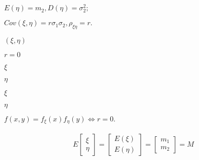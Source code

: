 \begin{preview}
\setcounter{equation}{0}%
\(E(\eta) = m_2, D(\eta) = \sigma_2^2;\)
\end{preview}

\begin{preview}
\setcounter{equation}{0}%
\(Cov(\xi, \eta) = r \sigma_1 \sigma_2, \rho_{\xi\eta} = r.\)
\end{preview}

\begin{preview}
\setcounter{equation}{0}%
\((\xi, \eta)\)
\end{preview}

\begin{preview}
\setcounter{equation}{0}%
\(r = 0\)
\end{preview}

\begin{preview}
\setcounter{equation}{0}%
\(\xi\)
\end{preview}

\begin{preview}
\setcounter{equation}{0}%
\(\eta\)
\end{preview}

\begin{preview}
\setcounter{equation}{0}%
\(\xi\)
\end{preview}

\begin{preview}
\setcounter{equation}{0}%
\(\eta\)
\end{preview}

\begin{preview}
\setcounter{equation}{0}%
\(f(x, y) = f_\xi(x) f_\eta(y) \Leftrightarrow r = 0.\)
\end{preview}

\begin{preview}
\setcounter{equation}{0}%
\begin{align}
E
\begin{bmatrix}
\xi \\ \eta
\end{bmatrix}
=
\begin{bmatrix}
E(\xi)\\ E(\eta)
\end{bmatrix}
=
\begin{bmatrix}
m_1 \\ m_2
\end{bmatrix}
= M
\end{align}

\end{preview}

